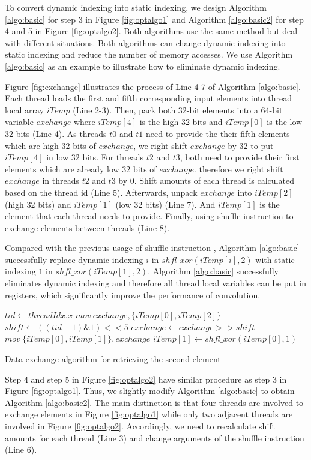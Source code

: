 To convert dynamic indexing into static indexing, we design Algorithm \ref{algo:basic} for step 3 in Figure \ref{fig:optalgo1} and
Algorithm \ref{algo:basic2} for step 4 and 5 in Figure \ref{fig:optalgo2}. Both algorithms use the same method but deal with different
situations. Both algorithms can change dynamic indexing into static indexing and reduce the number of memory accesses. We use Algorithm
\ref{algo:basic} as an example to illustrate how to eliminate dynamic indexing.

Figure \ref{fig:exchange} illustrates the process of Line 4-7 of Algorithm \ref{algo:basic}. Each thread loads the first and fifth
corresponding input elements into thread local array $iTemp$ (Line 2-3). Then, pack both 32-bit elements into a 64-bit variable $exchange$
where $iTemp[4]$ is the high 32 bits and $iTemp[0]$ is the low 32 bits (Line 4). As threads $t0$ and $t1$ need to provide the their fifth
elements which are high 32 bits of $exchange$, we right shift $exchange$ by 32 to put $iTemp[4]$ in low 32 bits. For threads $t2$ and $t3$,
both need to provide their first elements which are already low 32 bits of $exchange$. therefore we right shift $exchange$ in threads $t2$
and $t3$ by 0. Shift amounts of each thread is calculated based on the thread id (Line 5). Afterwards, unpack $exchange$ into $iTemp[2]$
(high 32 bits) and $iTemp[1]$ (low 32 bits) (Line 7). And $iTemp[1]$ is the element that each thread needs to provide. Finally, using
shuffle instruction to exchange elements between threads (Line 8).

Compared with the previous usage of shuffle instruction \cite{vasilache2014fast}, Algorithm \ref{algo:basic} successfully replace dynamic
indexing $i$ in $shfl\_xor(iTemp[i],2)$ with static indexing $1$ in $shfl\_xor(iTemp[1],2)$. Algorithm \ref{algo:basic} successfully
eliminates dynamic indexing and therefore all thread local variables can be put in registers, which significantly improve the performance
of convolution.

\begin{algorithm}
	$tid \gets threadIdx.x$\;
	$mov\ exchange, \{iTemp[0], iTemp[2]\}$\;
	$shift \gets ((tid+1)\&1)<<5$\;
	$exchange \gets exchange >> shift$\;
	$mov\ \{iTemp[0],iTemp[1]\}, exchange$\;
	$iTemp[1] \gets shfl\_xor(iTemp[0],1)$\;	
	\caption{Data exchange algorithm for retrieving the second element}
	\label{algo:basic2}
\end{algorithm}

Step 4 and step 5 in Figure \ref{fig:optalgo2} have similar procedure as step 3 in Figure \ref{fig:optalgo1}. Thus, we slightly modify
Algorithm \ref{algo:basic} to obtain Algorithm \ref{algo:basic2}. The main distinction is that four threads are involved to exchange
elements in Figure \ref{fig:optalgo1} while only two adjacent threads are involved in Figure \ref{fig:optalgo2}. Accordingly, we need to
recalculate shift amounts for each thread (Line 3) and change arguments of the shuffle instruction (Line 6).

